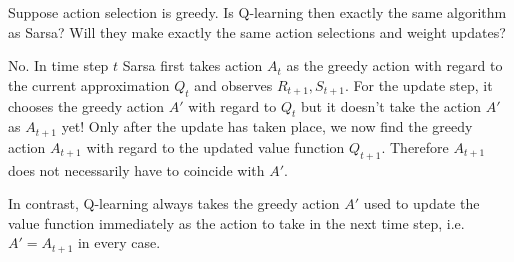 
\begin{exercise}[Exercise 6.12]

Suppose action selection is greedy. Is Q-learning then exactly the same
algorithm as Sarsa? Will they make exactly the same action selections
and weight updates?

\end{exercise}


\begin{solution}

No. In time step $t$ Sarsa first takes action $A_t$ as the
greedy action with regard to the current approximation $Q_t$
and observes $R_{t+1},S_{t+1}$. For the update step, it
chooses the greedy action $A'$ with regard to $Q_t$ but
it doesn't take the action $A'$ as $A_{t+1}$ yet!
Only after the update has taken place, we now find
the greedy action $A_{t+1}$ with regard to the updated value function $Q_{t+1}$.
Therefore $A_{t+1}$ does not necessarily have to coincide with $A'$.


In contrast, Q-learning always takes the greedy action $A'$
used to update the value function immediately as the action
to take in the next time step, i.e. $A' = A_{t+1}$ in every case.

\end{solution}

